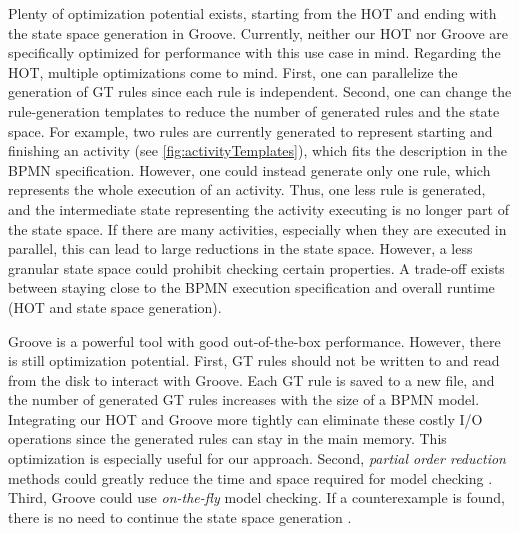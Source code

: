 \documentclass{lmcs} %
\begin{document}
Plenty of optimization potential exists, starting from the HOT and ending with the state space generation in Groove.
Currently, neither our HOT nor Groove are specifically optimized for performance with this use case in mind.
Regarding the HOT, multiple optimizations come to mind.
First, one can parallelize the generation of GT rules since each rule is independent.
Second, one can change the rule-generation templates to reduce the number of generated rules and the state space.
For example, two rules are currently generated to represent starting and finishing an activity (see \autoref{fig:activityTemplates}), which fits the description in the BPMN specification.
However, one could instead generate only one rule, which represents the whole execution of an activity.
Thus, one less rule is generated, and the intermediate state representing the activity executing is no longer part of the state space.
If there are many activities, especially when they are executed in parallel, this can lead to large reductions in the state space.
However, a less granular state space could prohibit checking certain properties.
A trade-off exists between staying close to the BPMN execution specification and overall runtime (HOT and state space generation).

Groove is a powerful tool with good out-of-the-box performance.
However, there is still optimization potential.
First, GT rules should not be written to and read from the disk to interact with Groove.
Each GT rule is saved to a new file, and the number of generated GT rules increases with the size of a BPMN model.
Integrating our HOT and Groove more tightly can eliminate these costly I/O operations since the generated rules can stay in the main memory.
This optimization is especially useful for our approach.
Second, \textit{partial order reduction} methods could greatly reduce the time and space required for model checking \cite{clarkeHandbookModelChecking2018}.
Third, Groove could use \textit{on-the-fly} model checking.
If a counterexample is found, there is no need to continue the state space generation \cite{clarkeHandbookModelChecking2018}.
\end{document}
